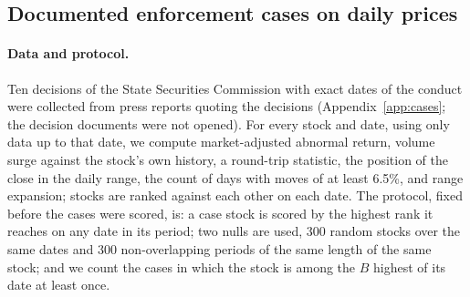 \subsection{Documented enforcement cases on daily prices}\label{sec:cases}

\paragraph{Data and protocol.} Ten decisions of the State Securities Commission with exact dates of the conduct were collected from press reports quoting the decisions (Appendix~\ref{app:cases}; the decision documents were not opened). For every stock and date, using only data up to that date, we compute market-adjusted abnormal return, volume surge against the stock's own history, a round-trip statistic, the position of the close in the daily range, the count of days with moves of at least 6.5\%, and range expansion; stocks are ranked against each other on each date. The protocol, fixed before the cases were scored, is: a case stock is scored by the highest rank it reaches on any date in its period; two nulls are used, 300 random stocks over the same dates and 300 non-overlapping periods of the same length of the same stock; and we count the cases in which the stock is among the $B$ highest of its date at least once.


